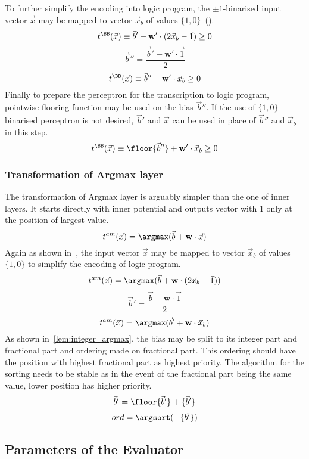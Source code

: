 To further simplify the encoding into logic program, the $\pm 1$-binarised
input vector $\vec x$ may be mapped to vector $\vec x_b$
of values $\{1, 0\}$~().
\[t^\BB(\vec x) \equiv \vec b' + \mathbf{w}'\cdot (2\vec x_b - \vec 1) \geq 0\]
\[\vec b'' = \frac{\vec b' - \mathbf{w}'\cdot \vec 1}{2}\]
\[t^\BB(\vec x) \equiv \vec b'' + \mathbf{w}'\cdot \vec x_b \geq 0\]
Finally to prepare the perceptron for the transcription to logic program,
pointwise flooring function may be used on the bias $\vec b''$.
If the use of $\{1, 0\}$-binarised perceptron is not desired, $\vec b'$ and $\vec x$
can be used in place of $\vec b''$ and $\vec x_b$ in this step.
\[t^\BB(\vec x) \equiv \floor{\vec b''} + \mathbf{w}'\cdot \vec x_b \geq 0\]

\subsubsection{Transformation of Argmax layer}

The transformation of Argmax layer is arguably simpler than the one of
inner layers. It starts directly with inner potential and outputs vector
with 1 only at the position of largest value.
\[t^{am}(\vec x) = \argmax(\vec b + \mathbf{w}\cdot \vec x)\]
Again as shown in~, the input vector $\vec x$
may be mapped to vector $\vec x_b$ of values $\{1,0\}$ to simplify the encoding
of logic program.
\[t^{am}(\vec x) = \argmax(\vec b + \mathbf{w}\cdot (2\vec x_b - \vec 1))\]
\[\vec b' = \frac{\vec b - \mathbf{w}\cdot \vec 1}{2}\]
\[t^{am}(\vec x) = \argmax(\vec b' + \mathbf{w}\cdot \vec x_b)\]
As shown in~\cref{lem:integer_argmax}, the bias may be split to its integer part
and fractional part and ordering made on fractional part. This ordering should have
the position with highest fractional part as highest priority. The algorithm for the
sorting needs to be stable as in the event of the fractional part being the same value,
lower position has higher priority.
\[\vec b' = \floor{\vec b'} + \{\vec b'\}\]
\[ord = \argsort(-\{\vec b'\})\]

\subsection{Parameters of the Evaluator}\label{sec:python_pars}

